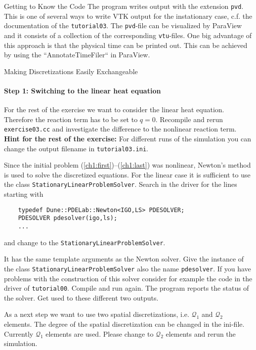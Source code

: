 \documentclass[12pt,a4paper]{article}
\begin{document}
\begin{Exercise}{Getting to Know the Code}
  The program writes output with the extension \lstinline!pvd!. This is one
  of several ways to write VTK output for the instationary case,
  c.f. the documentation of the \lstinline!tutorial03!. The
  \lstinline!pvd!-file can be visualized by ParaView and it consists of
  a collection of the corresponding \lstinline!vtu!-files.
  One big advantage of this approach is that the physical time can be
  printed out. This can be achieved by using the ``AnnotateTimeFiler``
  in ParaView.
\end{Exercise}

\begin{Exercise}{Making Discretizations Easily Exchangeable}
  \vspace{-2em}
  \paragraph{Step 1: Switching to the linear heat equation}
  For the rest of the exercise we want to consider the linear heat
  equation. Therefore the reaction term has to be set to $q =
  0$. Recompile and rerun \lstinline!exercise03.cc! and investigate the
  difference to the nonlinear reaction term. \newline
  \textbf{Hint for the rest of the exercise:} For different runs of the
  simulation you can change the output filename in
  \lstinline!tutorial03.ini!.

  Since the initial problem (\ref{ch1:first})--(\ref{ch1:last}) was
  nonlinear, Newton's method is used to solve the discretized
  equations. For the linear case it is sufficient to use the class
  \lstinline!StationaryLinearProblemSolver!. Search in the driver for
  the lines starting with
  \begin{lstlisting}
    typedef Dune::PDELab::Newton<IGO,LS> PDESOLVER;
    PDESOLVER pdesolver(igo,ls);
    ...
  \end{lstlisting}
  and change to the \lstinline!StationaryLinearProblemSolver!.

  It has the same template arguments as the Newton solver. Give the
  instance of the class \lstinline!StationaryLinearProblemSolver! also
  the name \lstinline!pdesolver!. If you have problems with the
  construction of this solver consider for example the code in the
  driver of \lstinline!tutorial00!. Compile and run again. The program
  reports the status of the solver. Get used to these different two
  outputs.

  As a next step we want to use two spatial discretizations,
  i.e. $\mathcal{Q}_1$ and $\mathcal{Q}_2$ elements. The degree of the
  spatial discretization can be changed in the ini-file. Currently
  $\mathcal{Q}_1$ elements are used. Please change to $\mathcal{Q}_2$
  elements and rerun the simulation.


\end{Exercise}
\end{document}
